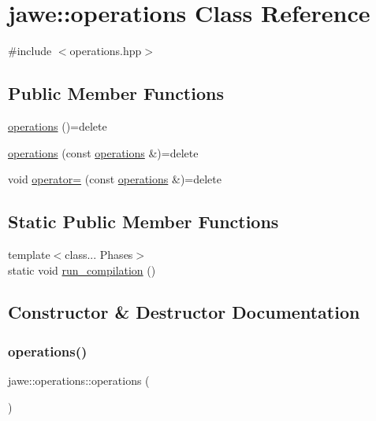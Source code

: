 \hypertarget{classjawe_1_1operations}{}\section{jawe\+:\+:operations Class Reference}
\label{classjawe_1_1operations}


{\ttfamily \#include $<$operations.\+hpp$>$}

\subsection*{Public Member Functions}
\begin{DoxyCompactItemize}
\item 
\hyperlink{classjawe_1_1operations_aa3b3ffd9859b79a1d45c4db2ee2e8a64}{operations} ()=delete
\item 
\hyperlink{classjawe_1_1operations_ad2bc3be4977c615d41438943de301df2}{operations} (const \hyperlink{classjawe_1_1operations}{operations} \&)=delete
\item 
void \hyperlink{classjawe_1_1operations_a3a3e733871595cc3a5af0aa1fa9ab381}{operator=} (const \hyperlink{classjawe_1_1operations}{operations} \&)=delete
\end{DoxyCompactItemize}
\subsection*{Static Public Member Functions}
\begin{DoxyCompactItemize}
\item 
{\footnotesize template$<$class... Phases$>$ }\\static void \hyperlink{classjawe_1_1operations_a078652a07a6ad9d6282f3b8aeab82049}{run\+\_\+compilation} ()
\end{DoxyCompactItemize}


\subsection{Constructor \& Destructor Documentation}
\mbox{\label{classjawe_1_1operations_aa3b3ffd9859b79a1d45c4db2ee2e8a64}} 
\subsubsection{\texorpdfstring{operations()}{operations()}\hspace{0.1cm}{\footnotesize\ttfamily [1/2]}}
{\footnotesize\ttfamily jawe\+::operations\+::operations (\begin{DoxyParamCaption}{ }\end{DoxyParamCaption})\hspace{0.3cm}{\ttfamily [delete]}}

